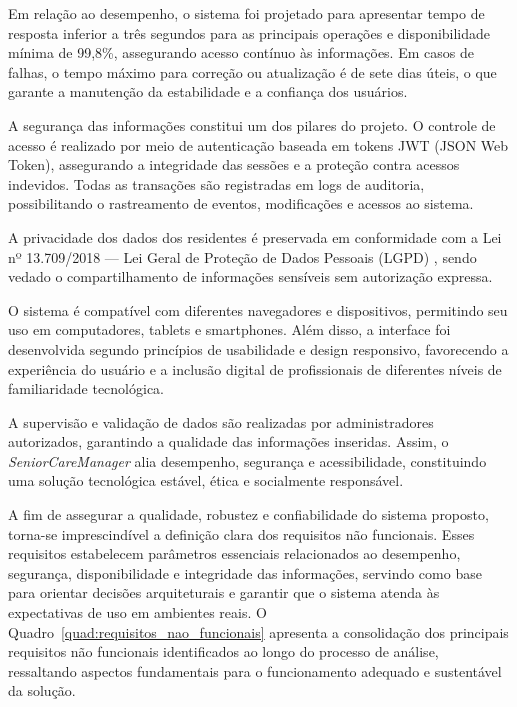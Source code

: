 Em relação ao desempenho, o sistema foi projetado para apresentar tempo de resposta inferior a três segundos para as principais operações e disponibilidade mínima de 99,8\%, assegurando acesso contínuo às informações. Em casos de falhas, o tempo máximo para correção ou atualização é de sete dias úteis, o que garante a manutenção da estabilidade e a confiança dos usuários.

A segurança das informações constitui um dos pilares do projeto. O controle de acesso é realizado por meio de autenticação baseada em tokens JWT (JSON Web Token), assegurando a integridade das sessões e a proteção contra acessos indevidos. Todas as transações são registradas em logs de auditoria, possibilitando o rastreamento de eventos, modificações e acessos ao sistema.  

A privacidade dos dados dos residentes é preservada em conformidade com a Lei nº 13.709/2018 — Lei Geral de Proteção de Dados Pessoais (LGPD) \textcite{brasil2018lgpd}, sendo vedado o compartilhamento de informações sensíveis sem autorização expressa.  

O sistema é compatível com diferentes navegadores e dispositivos, permitindo seu uso em computadores, tablets e smartphones. Além disso, a interface foi desenvolvida segundo princípios de usabilidade e design responsivo, favorecendo a experiência do usuário e a inclusão digital de profissionais de diferentes níveis de familiaridade tecnológica.  

A supervisão e validação de dados são realizadas por administradores autorizados, garantindo a qualidade das informações inseridas. Assim, o \textit{SeniorCareManager} alia desempenho, segurança e acessibilidade, constituindo uma solução tecnológica estável, ética e socialmente responsável.

A fim de assegurar a qualidade, robustez e confiabilidade do sistema proposto, torna-se imprescindível a definição clara dos requisitos não funcionais. Esses requisitos estabelecem parâmetros essenciais relacionados ao desempenho, segurança, disponibilidade e integridade das informações, servindo como base para orientar decisões arquiteturais e garantir que o sistema atenda às expectativas de uso em ambientes reais. O Quadro~\ref{quad:requisitos_nao_funcionais} apresenta a consolidação dos principais requisitos não funcionais identificados ao longo do processo de análise, ressaltando aspectos fundamentais para o funcionamento adequado e sustentável da solução.



